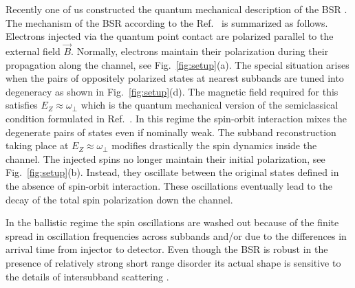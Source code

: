 Recently one of us constructed the quantum mechanical description of the BSR \cite{Berman2014}.
The mechanism of the BSR according to the Ref.~\cite{Berman2014} is summarized as follows. 
Electrons injected via the quantum point contact are polarized parallel to the external field $\vec{B}$.
Normally, electrons maintain their polarization during their propagation along the channel, see Fig.~\ref{fig:setup}(a).
The special situation arises when the pairs of oppositely polarized states at nearest subbands are tuned into degeneracy as shown in Fig.~\ref{fig:setup}(d).
The magnetic field required for this satisfies 
$E_Z \approx \omega_{\perp}$ which is the quantum mechanical version of the semiclassical condition formulated in Ref.~\cite{Frolov2009}.
In this regime the spin-orbit interaction mixes the degenerate pairs of states even if nominally weak. 
The subband reconstruction taking place at $E_Z \approx \omega_{\perp}$  modifies drastically the spin dynamics inside the channel.
The injected spins no longer maintain their initial polarization, see Fig.~\ref{fig:setup}(b).
Instead, they oscillate between the original states defined in the absence of spin-orbit interaction.
These oscillations eventually lead to the decay of the total spin polarization down the channel.

In the ballistic regime the spin oscillations are washed out because of the finite spread in oscillation frequencies across subbands and/or due to the 
differences in arrival time from injector to detector.
Even though the BSR is robust in the presence of relatively strong short range disorder \cite{Berman2014} its actual shape is sensitive to the details of intersubband scattering \cite{Hachiya2014}.

